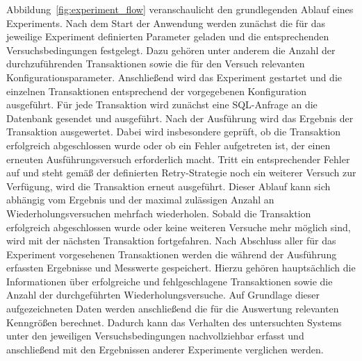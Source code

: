 
Abbildung~\ref{fig:experiment_flow} veranschaulicht den grundlegenden Ablauf eines Experiments.
Nach dem Start der Anwendung werden zunächst die für das jeweilige Experiment definierten Parameter geladen
und die entsprechenden Versuchsbedingungen festgelegt.
Dazu gehören unter anderem die Anzahl der durchzuführenden Transaktionen sowie die für den Versuch relevanten
Konfigurationsparameter.
Anschließend wird das Experiment gestartet und die einzelnen Transaktionen entsprechend der vorgegebenen Konfiguration
ausgeführt.
Für jede Transaktion wird zunächst eine SQL-Anfrage an die Datenbank gesendet und ausgeführt.
Nach der Ausführung wird das Ergebnis der Transaktion ausgewertet.
Dabei wird insbesondere geprüft, ob die Transaktion erfolgreich abgeschlossen wurde oder ob ein Fehler aufgetreten ist,
der einen erneuten Ausführungsversuch erforderlich macht.
Tritt ein entsprechender Fehler auf und steht gemäß der definierten Retry-Strategie noch ein weiterer Versuch zur
Verfügung, wird die Transaktion erneut ausgeführt.
Dieser Ablauf kann sich abhängig vom Ergebnis und der maximal zulässigen Anzahl an Wiederholungsversuchen
mehrfach wiederholen.
Sobald die Transaktion erfolgreich abgeschlossen wurde oder keine weiteren Versuche mehr möglich sind, wird mit der
nächsten Transaktion fortgefahren.
Nach Abschluss aller für das Experiment vorgesehenen Transaktionen werden die während der Ausführung erfassten
Ergebnisse und Messwerte gespeichert.
Hierzu gehören hauptsächlich die Informationen über erfolgreiche und fehlgeschlagene Transaktionen sowie die Anzahl
der durchgeführten Wiederholungsversuche.
Auf Grundlage dieser aufgezeichneten Daten werden anschließend die für die Auswertung relevanten Kenngrößen berechnet.
Dadurch kann das Verhalten des untersuchten Systems unter den jeweiligen Versuchsbedingungen nachvollziehbar
erfasst und anschließend mit den Ergebnissen anderer Experimente verglichen werden.

